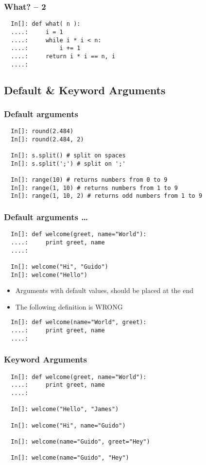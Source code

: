 \begin{frame}[fragile]
  \frametitle{What? -- 2}
  \begin{lstlisting}
  In[]: def what( n ):
  ....:     i = 1
  ....:     while i * i < n:
  ....:         i += 1
  ....:     return i * i == n, i
  ....:
  \end{lstlisting}
\end{frame}

\subsection*{Default \& Keyword Arguments}

\begin{frame}[fragile]
  \frametitle{Default arguments}
  \begin{lstlisting}
  In[]: round(2.484)
  In[]: round(2.484, 2)

  In[]: s.split() # split on spaces
  In[]: s.split(';') # split on ';'

  In[]: range(10) # returns numbers from 0 to 9
  In[]: range(1, 10) # returns numbers from 1 to 9
  In[]: range(1, 10, 2) # returns odd numbers from 1 to 9
  \end{lstlisting}
\end{frame}

\begin{frame}[fragile]
  \frametitle{Default arguments \ldots}
  \begin{lstlisting}
  In[]: def welcome(greet, name="World"):
  ....:     print greet, name
  ....:

  In[]: welcome("Hi", "Guido")
  In[]: welcome("Hello")
  \end{lstlisting}
  \begin{itemize}
  \item Arguments with default values, should be placed at the end
  \item The following definition is \alert{WRONG}
  \end{itemize}
  \begin{lstlisting}
  In[]: def welcome(name="World", greet):
  ....:     print greet, name
  ....:
  \end{lstlisting}
\end{frame}

\begin{frame}[fragile]
  \frametitle{Keyword Arguments}
  \begin{lstlisting}
  In[]: def welcome(greet, name="World"):
  ....:     print greet, name
  ....:

  In[]: welcome("Hello", "James")

  In[]: welcome("Hi", name="Guido")

  In[]: welcome(name="Guido", greet="Hey")

  In[]: welcome(name="Guido", "Hey")
  \end{lstlisting}
\end{frame}


